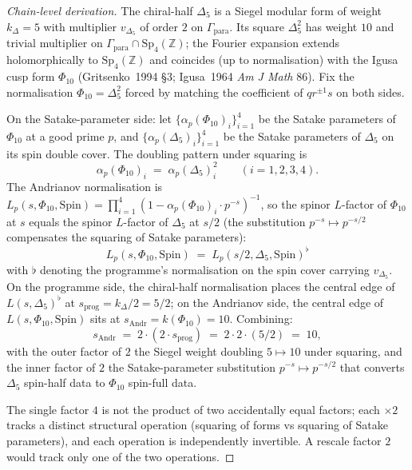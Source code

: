 \begin{proof}[Chain-level derivation]
The chiral-half $\Delta_5$ is a Siegel modular form of weight $k_\Delta
= 5$ with multiplier $v_{\Delta_5}$ of order $2$ on $\Gamma_{\mathrm{para}}$.
Its square $\Delta_5^2$ has weight $10$ and trivial multiplier on
$\Gamma_{\mathrm{para}} \cap \mathrm{Sp}_4(\mathbb{Z})$; the Fourier
expansion extends holomorphically to $\mathrm{Sp}_4(\mathbb{Z})$ and
coincides (up to normalisation) with the Igusa cusp form $\Phi_{10}$
(Gritsenko~1994 \S$3$; Igusa~1964 \emph{Am J Math} $86$).  Fix the
normalisation $\Phi_{10} = \Delta_5^2$ forced by matching the
coefficient of $q r^{\pm 1} s$ on both sides.

On the Satake-parameter side: let $\{\alpha_{p}(\Phi_{10})_i\}_{i = 1}^4$
be the Satake parameters of $\Phi_{10}$ at a good prime $p$, and
$\{\alpha_p(\Delta_5)_i\}_{i = 1}^4$ be the Satake parameters of
$\Delta_5$ on its spin double cover.  The doubling pattern under
squaring is
\[
 \alpha_p(\Phi_{10})_i \;=\; \alpha_p(\Delta_5)_i^2 \qquad
 (i = 1, 2, 3, 4).
\]
The Andrianov normalisation is $L_p(s, \Phi_{10}, \mathrm{Spin}) =
\prod_{i = 1}^4 (1 - \alpha_p(\Phi_{10})_i \cdot p^{-s})^{-1}$, so
the spinor $L$-factor of $\Phi_{10}$ at $s$ equals the spinor
$L$-factor of $\Delta_5$ at $s / 2$ (the substitution $p^{-s}
\mapsto p^{-s/2}$ compensates the squaring of Satake parameters):
\[
 L_p(s, \Phi_{10}, \mathrm{Spin}) \;=\; L_p(s / 2, \Delta_5, \mathrm{Spin})^{\flat}
\]
with $\flat$ denoting the programme's normalisation on the spin cover
carrying $v_{\Delta_5}$.  On the programme side, the chiral-half
normalisation places the central edge of $L(s, \Delta_5)^{\flat}$ at
$s_{\mathrm{prog}} = k_\Delta / 2 = 5/2$; on the Andrianov side, the
central edge of $L(s, \Phi_{10}, \mathrm{Spin})$ sits at
$s_{\mathrm{Andr}} = k(\Phi_{10}) = 10$.  Combining:
\[
 s_{\mathrm{Andr}} \;=\; 2 \cdot (2 \cdot s_{\mathrm{prog}})
  \;=\; 2 \cdot 2 \cdot (5/2) \;=\; 10,
\]
with the outer factor of $2$ the Siegel weight doubling $5 \mapsto 10$
under squaring, and the inner factor of $2$ the Satake-parameter
substitution $p^{-s} \mapsto p^{-s/2}$ that converts $\Delta_5$
spin-half data to $\Phi_{10}$ spin-full data.

The single factor $4$ is not the product of two accidentally equal
factors; each $\times 2$ tracks a distinct structural operation
(squaring of forms vs squaring of Satake parameters), and each
operation is independently invertible.  A rescale factor $2$ would
track only one of the two operations.
\end{proof}

